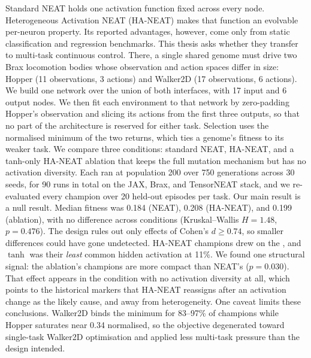 
%

Standard NEAT holds one activation function fixed across every node. Heterogeneous Activation NEAT (HA-NEAT) makes that function an evolvable per-neuron property. Its reported advantages, however, come only from static classification and regression benchmarks. This thesis asks whether they transfer to multi-task continuous control. There, a single shared genome must drive two Brax locomotion bodies whose observation and action spaces differ in size: Hopper (11 observations, 3 actions) and Walker2D (17 observations, 6 actions). We build one network over the union of both interfaces, with 17 input and 6 output nodes. We then fit each environment to that network by zero-padding Hopper's observation and slicing its actions from the first three outputs, so that no part of the architecture is reserved for either task. Selection uses the normalised minimum of the two returns, which ties a genome's fitness to its weaker task. We compare three conditions: standard NEAT, HA-NEAT, and a tanh-only HA-NEAT ablation that keeps the full mutation mechanism but has no activation diversity. Each ran at population 200 over 750 generations across 30 seeds, for 90 runs in total on the JAX, Brax, and TensorNEAT stack, and we re-evaluated every champion over 20 held-out episodes per task.
Our main result is a null result. Median fitness was 0.184 (NEAT), 0.208 (HA-NEAT), and 0.199 (ablation), with no difference across conditions (Kruskal--Wallis $H = 1.48$, $p = 0.476$). The design rules out only effects of Cohen's $d \geq 0.74$, so smaller differences could have gone undetected. HA-NEAT champions drew on the , and $\tanh$ was their \emph{least} common hidden activation at 11\%. We found one structural signal: the ablation's champions are more compact than NEAT's ($p = 0.030$). That effect appears in the condition with no activation diversity at all, which points to the historical markers that HA-NEAT reassigns after an activation change as the likely cause, and away from heterogeneity. One caveat limits these conclusions. Walker2D binds the minimum for 83--97\% of champions while Hopper saturates near 0.34 normalised, so the objective degenerated toward single-task Walker2D optimisation and applied less multi-task pressure than the design intended.

